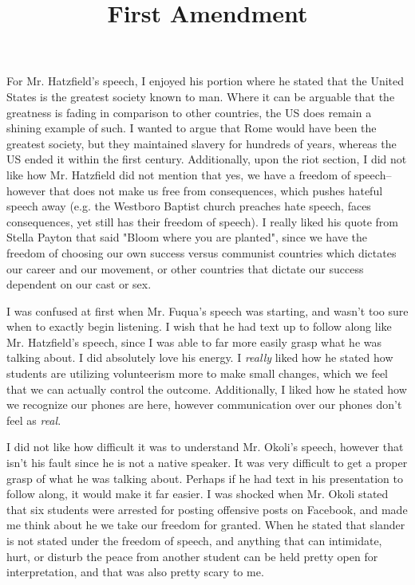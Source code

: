 \documentclass[12pt]{article}
\begin{document}
\title{First Amendment}
\par
For Mr. Hatzfield's speech, I enjoyed his portion where he stated that the United States is the greatest society known to man. Where it can be arguable that the greatness is fading in comparison to other countries, the US does remain a shining example of such. I wanted to argue that Rome would have been the greatest society, but they maintained slavery for hundreds of years, whereas the US ended it within the first century. Additionally, upon the riot section, I did not like how Mr. Hatzfield did not mention that yes, we have a freedom of speech-- however that does not make us free from consequences, which pushes hateful speech away (e.g. the Westboro Baptist church preaches hate speech, faces consequences, yet still has their freedom of speech). I really liked his quote from Stella Payton that said "Bloom where you are planted", since we have the freedom of choosing our own success versus communist countries which dictates our career and our movement, or other countries that dictate our success dependent on our cast or sex.
\par
I was confused at first when Mr. Fuqua's speech was starting, and wasn't too sure when to exactly begin listening. I wish that he had text up to follow along like Mr. Hatzfield's speech, since I was able to far more easily grasp what he was talking about. I did absolutely love his energy. I \emph{really} liked how he stated how students are utilizing volunteerism more to make small changes, which we feel that we can actually control the outcome. Additionally, I liked how he stated how we recognize our phones are here, however communication over our phones don't feel as \emph{real}.
\par
I did not like how difficult it was to understand Mr. Okoli's speech, however that isn't his fault since he is not a native speaker. It was very difficult to get a proper grasp of what he was talking about. Perhaps if he had text in his presentation to follow along, it would make it far easier. I was shocked when Mr. Okoli stated that six students were arrested for posting offensive posts on Facebook, and made me think about he we take our freedom for granted. When he stated that slander is not stated under the freedom of speech, and anything that can intimidate, hurt, or disturb the peace from another student can be held pretty open for interpretation, and that was also pretty scary to me.
\end{document}
